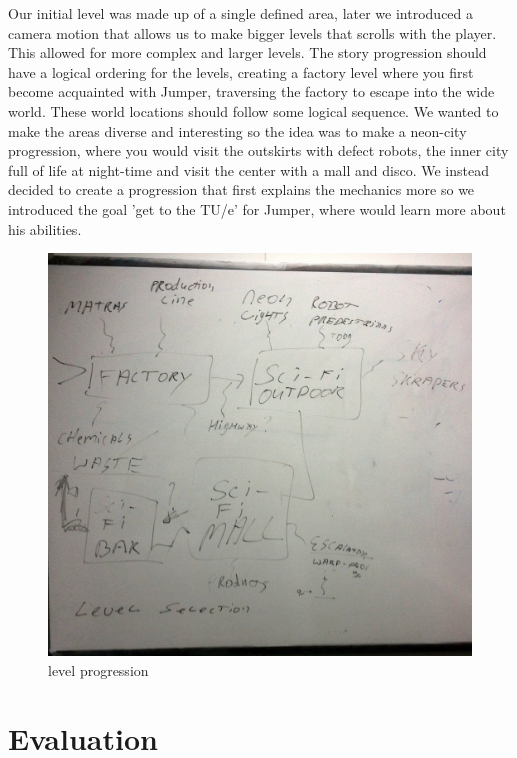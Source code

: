 \documentclass[a4paper,twoside,12pt]{article}
\begin{document}
Our initial level was made up of a single defined area, later we introduced a camera motion that allows us to make bigger levels that scrolls with the player. This allowed for more complex and larger levels.
The story progression should have a logical ordering for the levels, creating a factory level where you first become acquainted with Jumper, traversing the factory to escape into the wide world. These world locations should follow some logical sequence. We wanted to make the areas diverse and interesting so the idea was to make a neon-city progression, where you would visit the outskirts with defect robots, the inner city full of life at night-time and visit the center with a mall and disco. We instead decided to create a progression that first explains the mechanics more so we introduced the goal 'get to the TU/e' for Jumper, where would learn more about his abilities.
\begin{figure}[H]
\includegraphics[scale=0.2]{locations}
\caption{level progression}
\end{figure}

\section{Evaluation}
\end{document}
